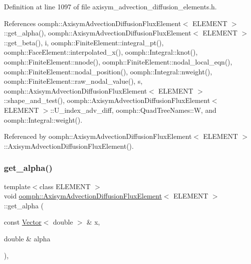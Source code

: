 Definition at line 1097 of file axisym\+\_\+advection\+\_\+diffusion\+\_\+elements.\+h.



References oomph\+::\+Axisym\+Advection\+Diffusion\+Flux\+Element$<$ E\+L\+E\+M\+E\+N\+T $>$\+::get\+\_\+alpha(), oomph\+::\+Axisym\+Advection\+Diffusion\+Flux\+Element$<$ E\+L\+E\+M\+E\+N\+T $>$\+::get\+\_\+beta(), i, oomph\+::\+Finite\+Element\+::integral\+\_\+pt(), oomph\+::\+Face\+Element\+::interpolated\+\_\+x(), oomph\+::\+Integral\+::knot(), oomph\+::\+Finite\+Element\+::nnode(), oomph\+::\+Finite\+Element\+::nodal\+\_\+local\+\_\+eqn(), oomph\+::\+Finite\+Element\+::nodal\+\_\+position(), oomph\+::\+Integral\+::nweight(), oomph\+::\+Finite\+Element\+::raw\+\_\+nodal\+\_\+value(), s, oomph\+::\+Axisym\+Advection\+Diffusion\+Flux\+Element$<$ E\+L\+E\+M\+E\+N\+T $>$\+::shape\+\_\+and\+\_\+test(), oomph\+::\+Axisym\+Advection\+Diffusion\+Flux\+Element$<$ E\+L\+E\+M\+E\+N\+T $>$\+::\+U\+\_\+index\+\_\+adv\+\_\+diff, oomph\+::\+Quad\+Tree\+Names\+::W, and oomph\+::\+Integral\+::weight().



Referenced by oomph\+::\+Axisym\+Advection\+Diffusion\+Flux\+Element$<$ E\+L\+E\+M\+E\+N\+T $>$\+::\+Axisym\+Advection\+Diffusion\+Flux\+Element().

\mbox{\label{classoomph_1_1AxisymAdvectionDiffusionFluxElement_a556be18a2a9c91d5da9c3611422efa87}} 
\subsubsection{\texorpdfstring{get\+\_\+alpha()}{get\_alpha()}}
{\footnotesize\ttfamily template$<$class E\+L\+E\+M\+E\+NT $>$ \\
void \hyperlink{classoomph_1_1AxisymAdvectionDiffusionFluxElement}{oomph\+::\+Axisym\+Advection\+Diffusion\+Flux\+Element}$<$ E\+L\+E\+M\+E\+NT $>$\+::get\+\_\+alpha (\begin{DoxyParamCaption}\item[{const \hyperlink{classoomph_1_1Vector}{Vector}$<$ double $>$ \&}]{x,  }\item[{double \&}]{alpha }\end{DoxyParamCaption})\hspace{0.3cm}{\ttfamily [inline]}, {\ttfamily [protected]}}



